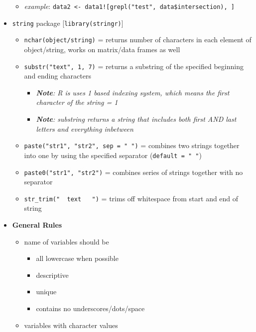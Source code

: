 \documentclass[
]{article}
\providecommand{\tightlist}{%
  \setlength{\itemsep}{0pt}\setlength{\parskip}{0pt}}
\begin{document}
\begin{itemize}
  \begin{itemize}
  \tightlist
  \item
    \emph{example}:
    \texttt{data2\ \textless{}-\ data1!{[}grepl("test",\ data\$intersection),\ {]}}
  \end{itemize}
\item
  \texttt{string} package {[}\texttt{library(stringr)}{]}

  \begin{itemize}
  \tightlist
  \item
    \texttt{nchar(object/string)} = returns number of characters in each
    element of object/string, works on matrix/data frames as well
  \item
    \texttt{substr("text",\ 1,\ 7)} = returns a substring of the
    specified beginning and ending characters

    \begin{itemize}
    \tightlist
    \item
      \emph{\textbf{Note}: R is uses 1 based indexing system, which
      means the first character of the string = 1 }
    \item
      \emph{\textbf{Note}: substring returns a string that includes both
      first AND last letters and everything inbetween }
    \end{itemize}
  \item
    \texttt{paste("str1",\ "str2",\ sep\ =\ "\ ")} = combines two
    strings together into one by using the specified separator
    (\texttt{default\ =\ "\ "})
  \item
    \texttt{paste0("str1",\ "str2")} = combines series of strings
    together with no separator
  \item
    \texttt{str\_trim("\ \ text\ \ \ ")} = trims off whitespace from
    start and end of string
  \end{itemize}
\item
  \textbf{General Rules}

  \begin{itemize}
  \tightlist
  \item
    name of variables should be

    \begin{itemize}
    \tightlist
    \item
      all lowercase when possible
    \item
      descriptive
    \item
      unique
    \item
      contains no underscores/dots/space
    \end{itemize}
  \item
    variables with character values


\end{itemize}
\end{itemize}
\end{document}
